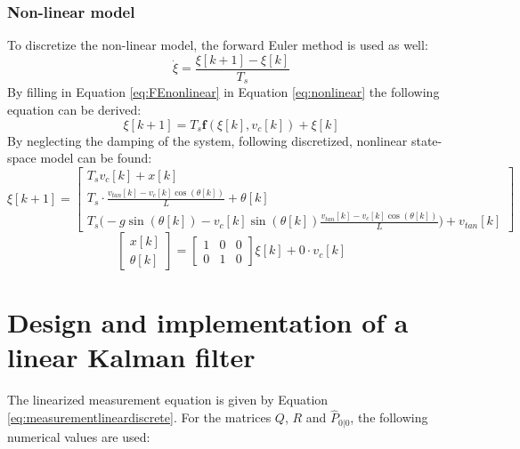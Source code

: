 \documentclass[a4paper,kul]{kulakarticle} %
\begin{document}
\subsubsection*{Non-linear model}
To discretize the non-linear model, the forward Euler method is used as well:
\begin{equation}
	\dot{\xi} = \frac{\xi[k+1]-\xi[k]}{T_s}
	\label{eq:FEnonlinear}
	\end{equation}
	By filling in Equation \ref{eq:FEnonlinear} in Equation \ref{eq:nonlinear} the following equation can be derived:
	\begin{equation}
	\xi[k+1] = T_s\mathbf{f}(\xi[k],v_c[k]) + \xi[k]
	\end{equation}
	By neglecting the damping of the system, following discretized, nonlinear state-space model can be found:
	\begin{equation}
	\xi[k+1] = \begin{bmatrix}
	T_sv_c[k] + x[k]\\T_s\cdot\frac{v_{tan}[k] - v_c[k]\cos(\theta[k])}{L} + \theta[k]\\
	T_s\bigg(-g\sin(\theta[k]) - v_c[k]\sin(\theta[k])\frac{v_{tan}[k]-v_c[k]\cos(\theta[k])}{L}\bigg) + v_{tan}[k]
	\end{bmatrix}
	\label{eq:ssnonlineardiscrete}
	\end{equation}
	\begin{equation}
	\begin{bmatrix}
	x[k]\\\theta[k]
	\end{bmatrix} = \begin{bmatrix}
	1&0&0\\0&1&0
	\end{bmatrix}\xi[k] + 0 \cdot v_c[k]
	\label{eq:measurementlineardiscrete}
\end{equation}
	
\section{Design and implementation of a linear Kalman filter}
\label{sec:2}
The linearized measurement equation is given by Equation \ref{eq:measurementlineardiscrete}. For the matrices $Q$, $R$ and $\hat{P}_{0|0}$, the following numerical values are used:
\end{document}
